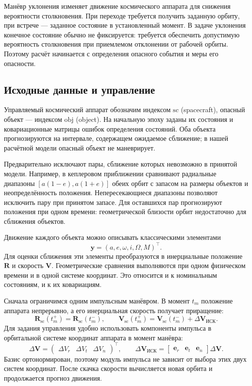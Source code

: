 \documentclass[a4paper,11pt]{article}
\newcommand{\vect}[1]{\boldsymbol{#1}}
\numberwithin{equation}{section}
\begin{document}
Манёвр уклонения изменяет движение космического аппарата для
снижения вероятности столкновения. При переходе требуется получить
заданную орбиту, при встрече --- заданное состояние в установленный
момент. В задаче уклонения конечное состояние обычно не фиксируется:
требуется обеспечить допустимую вероятность столкновения при
приемлемом отклонении от рабочей орбиты. Поэтому расчёт начинается
с определения опасного события и меры его опасности.

\subsection{Исходные данные и управление}

Управляемый космический аппарат обозначим индексом $\mathrm{sc}$
(spacecraft), опасный объект --- индексом $\mathrm{obj}$ (object).
На начальную эпоху заданы их состояния и ковариационные матрицы
ошибок определения состояний. Оба объекта прогнозируются на
интервале, содержащем ожидаемое сближение; в нашей расчётной модели
опасный объект не маневрирует.

Предварительно исключают пары, сближение которых невозможно
в принятой модели. Например, в кеплеровом приближении сравнивают
радиальные диапазоны $[a(1-e),a(1+e)]$ обеих орбит с запасом
на размеры объектов и неопределённость положения. Непересекающиеся
диапазоны позволяют исключить пару при принятом запасе. Для
оставшихся пар прогнозируют положения при одном времени:
геометрической близости орбит недостаточно для сближения объектов.

Движение каждого объекта можно описывать классическими элементами
\[
\vect y=(a,e,\omega,i,\Omega,M)^\top.
\]
Для оценки сближения эти элементы преобразуются в инерциальные
положение $\vect R$ и скорость $\vect V$. Геометрические сравнения
выполняются при одном физическом времени и в одной системе координат.
Это относится и к номинальным состояниям, и к их ковариациям.

Сначала ограничимся одним импульсным манёвром. В момент $t_m$
положение аппарата непрерывно, а его инерциальная скорость получает
приращение:
\begin{equation}
\vect R_{\mathrm{sc}}(t_m^+)=\vect R_{\mathrm{sc}}(t_m^-),\qquad
\vect V_{\mathrm{sc}}(t_m^+)=\vect V_{\mathrm{sc}}(t_m^-)+\Delta\vect V_{\text{ИСК}}.
\label{eq:initial-impulse-jump}
\end{equation}
Для задания управления удобно использовать компоненты импульса
в орбитальной системе координат аппарата в момент манёвра:
\begin{equation}
\Delta\vect V=
\begin{pmatrix}\Delta V_r&\Delta V_t&\Delta V_n\end{pmatrix}^{\!\top},
\qquad
\Delta\vect V_{\text{ИСК}}=
\begin{bmatrix}\vect e_r&\vect e_t&\vect e_n\end{bmatrix}
\Delta\vect V.
\label{eq:rtn-impulse}
\end{equation}
Базис ортонормирован, поэтому модуль импульса не зависит от выбора
этих двух систем координат. После скачка скорости вычисляется новая
орбита и продолжается прогноз движения.
\end{document}
